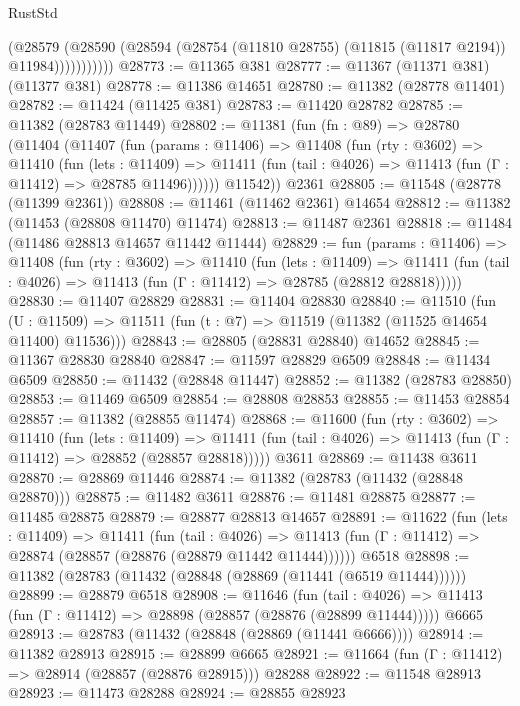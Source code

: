 \begin{lexlean}{RustStd}
\begin{coremodule}
                  (@28579
                    (@28590
                      (@28594 (@28754 (@11810 @28755) (@11815 (@11817 @2194)) @11984)))))))))))
@28773 := @11365 @381
@28777 := @11367 (@11371 @381) (@11377 @381)
@28778 := @11386 @14651
@28780 := @11382 (@28778 @11401)
@28782 := @11424 (@11425 @381)
@28783 := @11420 @28782
@28785 := @11382 (@28783 @11449)
@28802 := @11381
    (fun (fn : @89) =>
    @28780
      (@11404
        (@11407
          (fun (params : @11406) =>
          @11408
            (fun (rty : @3602) =>
            @11410
              (fun (lets : @11409) =>
              @11411 (fun (tail : @4026) => @11413 (fun (Γ : @11412) => @28785 @11496))))))
        @11542))
    @2361
@28805 := @11548 (@28778 (@11399 @2361))
@28808 := @11461 (@11462 @2361) @14654
@28812 := @11382 (@11453 (@28808 @11470) @11474)
@28813 := @11487 @2361
@28818 := @11484 (@11486 @28813 @14657 @11442 @11444)
@28829 := fun (params : @11406) =>
  @11408
    (fun (rty : @3602) =>
    @11410
      (fun (lets : @11409) =>
      @11411 (fun (tail : @4026) => @11413 (fun (Γ : @11412) => @28785 (@28812 @28818)))))
@28830 := @11407 @28829
@28831 := @11404 @28830
@28840 := @11510
    (fun (U : @11509) => @11511 (fun (t : @7) => @11519 (@11382 (@11525 @14654 @11400) @11536)))
@28843 := @28805 (@28831 @28840) @14652
@28845 := @11367 @28830 @28840
@28847 := @11597 @28829 @6509
@28848 := @11434 @6509
@28850 := @11432 (@28848 @11447)
@28852 := @11382 (@28783 @28850)
@28853 := @11469 @6509
@28854 := @28808 @28853
@28855 := @11453 @28854
@28857 := @11382 (@28855 @11474)
@28868 := @11600
    (fun (rty : @3602) =>
    @11410
      (fun (lets : @11409) =>
      @11411 (fun (tail : @4026) => @11413 (fun (Γ : @11412) => @28852 (@28857 @28818)))))
    @3611
@28869 := @11438 @3611
@28870 := @28869 @11446
@28874 := @11382 (@28783 (@11432 (@28848 @28870)))
@28875 := @11482 @3611
@28876 := @11481 @28875
@28877 := @11485 @28875
@28879 := @28877 @28813 @14657
@28891 := @11622
    (fun (lets : @11409) =>
    @11411
      (fun (tail : @4026) =>
      @11413 (fun (Γ : @11412) => @28874 (@28857 (@28876 (@28879 @11442 @11444))))))
    @6518
@28898 := @11382 (@28783 (@11432 (@28848 (@28869 (@11441 (@6519 @11444))))))
@28899 := @28879 @6518
@28908 := @11646
    (fun (tail : @4026) => @11413 (fun (Γ : @11412) => @28898 (@28857 (@28876 (@28899 @11444)))))
    @6665
@28913 := @28783 (@11432 (@28848 (@28869 (@11441 @6666))))
@28914 := @11382 @28913
@28915 := @28899 @6665
@28921 := @11664 (fun (Γ : @11412) => @28914 (@28857 (@28876 @28915))) @28288
@28922 := @11548 @28913
@28923 := @11473 @28288
@28924 := @28855 @28923

\end{coremodule}
\end{lexlean}
